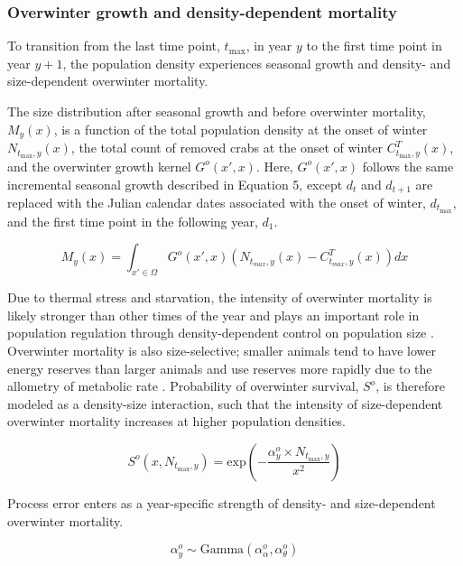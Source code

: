 \documentclass{article}
\begin{document}
\subsubsection*{Overwinter growth and density-dependent mortality}

To transition from the last time point, $t_{\text{max}}$, in year $y$ to the first time point in year $y+1$, the population density experiences seasonal growth and density- and size-dependent overwinter mortality. 

The size distribution after seasonal growth and before overwinter mortality, $M_y(x)$, is a function of the total population density at the onset of winter $N_{t_{\text{max}}, y}(x)$, the total count of removed crabs at the onset of winter $C^T_{t_{\text{max}}, y}(x)$, and the overwinter growth kernel $G^o(x',x)$. Here, $G^o(x',x)$ follows the same incremental seasonal growth described in Equation 5, except $d_t$ and $d_{t+1}$ are replaced with the Julian calendar dates associated with the onset of winter, $d_{t_\text{max}}$, and the first time point in the following year, $d_1$.

\begin{equation}
M_y(x) = \int_{x' \in \Omega} G^o(x',x) (N_{t_{max},y}(x) - C^T_{t_{max},y}(x))dx
\end{equation}

Due to thermal stress and starvation, the intensity of overwinter mortality is likely stronger than other times of the year and plays an important role in population regulation through density-dependent control on population size \parencite{henderson1988size}. Overwinter mortality is also size-selective; smaller animals tend to have lower energy reserves than larger animals and use reserves more rapidly due to the allometry of metabolic rate \parencite{hurst2007causes}. Probability of overwinter survival, $S^o$, is therefore modeled as a density-size interaction, such that the intensity of size-dependent overwinter mortality increases at higher population densities.

\begin{equation}
S^o(x,N_{t_{\text{max}},y}) = \text{exp}\left(-\frac{\alpha_y^o \times N_{t_{\text{max}},y}}{x^2}\right)
\end{equation}

Process error enters as a year-specific strength of density- and size-dependent overwinter mortality.

\begin{equation}
\alpha^o_y \sim \text{Gamma}(\alpha^o_{\alpha}, \alpha^o_{\theta})
\end{equation}
\end{document}
